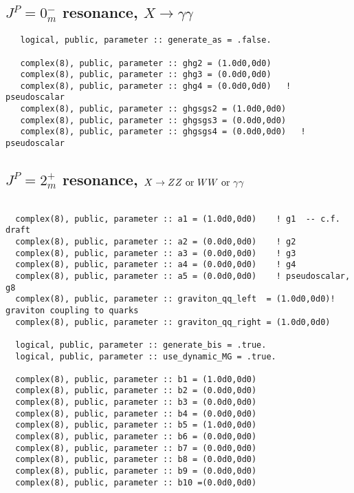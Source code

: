 \documentclass[aps,superscriptaddress,nofootinbib]{revtex4}
\begin{document}
\subsection{ $J^P = 0^-_m$ resonance, $X \to \gamma \gamma$}
\label{sec:exD}

\begin{verbatim}
   logical, public, parameter :: generate_as = .false.

   complex(8), public, parameter :: ghg2 = (1.0d0,0d0)
   complex(8), public, parameter :: ghg3 = (0.0d0,0d0)
   complex(8), public, parameter :: ghg4 = (0.0d0,0d0)   ! pseudoscalar
   complex(8), public, parameter :: ghgsgs2 = (1.0d0,0d0)
   complex(8), public, parameter :: ghgsgs3 = (0.0d0,0d0)
   complex(8), public, parameter :: ghgsgs4 = (0.0d0,0d0)   ! pseudoscalar
\end{verbatim}

\subsection{ $J^P = 2^+_m$ resonance, $X \to ZZ~{\rm or}~WW~{\rm or}~\gamma \gamma$}

\begin{verbatim}

  complex(8), public, parameter :: a1 = (1.0d0,0d0)    ! g1  -- c.f. draft
  complex(8), public, parameter :: a2 = (0.0d0,0d0)    ! g2
  complex(8), public, parameter :: a3 = (0.0d0,0d0)    ! g3
  complex(8), public, parameter :: a4 = (0.0d0,0d0)    ! g4
  complex(8), public, parameter :: a5 = (0.0d0,0d0)    ! pseudoscalar, g8
  complex(8), public, parameter :: graviton_qq_left  = (1.0d0,0d0)! graviton coupling to quarks
  complex(8), public, parameter :: graviton_qq_right = (1.0d0,0d0)

  logical, public, parameter :: generate_bis = .true.
  logical, public, parameter :: use_dynamic_MG = .true.

  complex(8), public, parameter :: b1 = (1.0d0,0d0)
  complex(8), public, parameter :: b2 = (0.0d0,0d0)
  complex(8), public, parameter :: b3 = (0.0d0,0d0)
  complex(8), public, parameter :: b4 = (0.0d0,0d0)
  complex(8), public, parameter :: b5 = (1.0d0,0d0)
  complex(8), public, parameter :: b6 = (0.0d0,0d0)
  complex(8), public, parameter :: b7 = (0.0d0,0d0)
  complex(8), public, parameter :: b8 = (0.0d0,0d0)
  complex(8), public, parameter :: b9 = (0.0d0,0d0)
  complex(8), public, parameter :: b10 =(0.0d0,0d0)

\end{verbatim}
\end{document}
